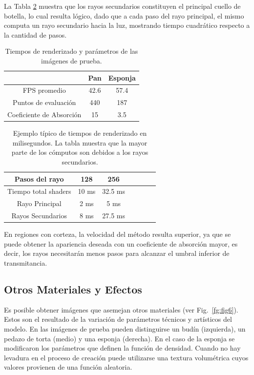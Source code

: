 La Tabla \ref{tab:rayossecundarios} muestra que los rayos secundarios constituyen el principal cuello de botella, lo cual resulta lógico, dado que a cada paso del rayo principal, el mismo computa un rayo secundario hacia la luz, mostrando tiempo cuadrático respecto a la cantidad de pasos.


\begin{table}[htb]
\centering
\begin{tabular}{|c|c|c|}
\hline &  Pan & Esponja \\
\hline
\hline
 FPS promedio & 42.6 & 57.4\\
\hline
 Puntos de evaluación &  440  & 187 \\
\hline
 Coeficiente de Absorción &  15  & 3.5 \\
\hline
\end{tabular}
\caption{Tiempos de renderizado y parámetros de las imágenes de prueba.}
\label{tab:tiemposrenderizado}
\end{table}

\begin{table}[htb]
\centering
\begin{tabular}{|c|c|c|c|c|c|c|}
\hline
 Pasos del rayo         & 128 &  256 \\
\hline
\hline
 Tiempo total shaders   & 10 ms &  32.5 ms \\
\hline
 Rayo Principal         & 2 ms  & 5 ms  \\
\hline
 Rayos Secundarios      &  8 ms & 27.5 ms  \\
\hline
\end{tabular}
\caption[Tiempos de renderizado en milisegundos]{Ejemplo típico de tiempos de renderizado en milisegundos. La tabla muestra que la mayor parte de los cómputos son debidos a los rayos secundarios.}
\label{tab:rayossecundarios}
\end{table}


En regiones con corteza, la velocidad del método resulta superior, ya que se puede obtener la apariencia deseada con un coeficiente de absorción mayor, es decir, los rayos necesitarán menos pasos para alcanzar el umbral inferior de transmitancia.

\subsection{Otros Materiales y Efectos}
Es posible obtener imágenes que asemejan otros materiales (ver Fig.~\ref{fg:fig6}).
Estos son el resultado de la variación de parámetros técnicos y artísticos del modelo.
En las imágenes de prueba pueden distinguirse un budín (izquierda), un pedazo de torta (medio) y una esponja (derecha).
En el caso de la esponja se modificaron los parámetros que definen la función de densidad.
Cuando no hay levadura en el proceso de creación puede utilizarse una textura volumétrica cuyos valores provienen de una función aleatoria.

